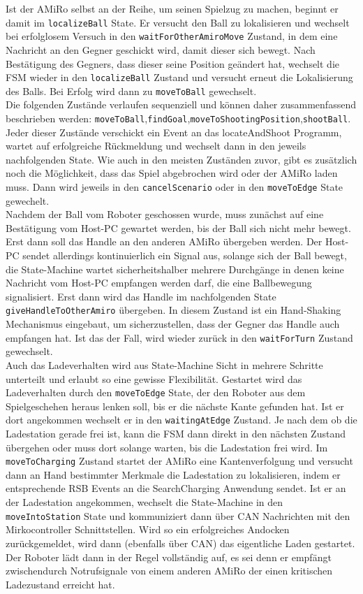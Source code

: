 Ist der AMiRo selbst an der Reihe, um seinen Spielzug zu machen, beginnt er damit im \texttt{localizeBall} State. Er versucht den Ball zu lokalisieren und wechselt bei erfolglosem Versuch in den \texttt{waitForOtherAmiroMove} Zustand, in dem eine Nachricht an den Gegner geschickt wird, damit dieser sich bewegt. Nach Bestätigung des Gegners, dass dieser seine Position geändert hat, wechselt die FSM wieder in den \texttt{localizeBall} Zustand und versucht erneut die Lokalisierung des Balls. Bei Erfolg wird dann zu \texttt{moveToBall} gewechselt.\\
Die folgenden Zustände verlaufen sequenziell und können daher zusammenfassend beschrieben werden:
\texttt{moveToBall},\texttt{findGoal},\texttt{moveToShootingPosition},\texttt{shootBall}. Jeder dieser Zustände verschickt ein Event an das locateAndShoot Programm, wartet auf erfolgreiche Rückmeldung und wechselt dann in den jeweils nachfolgenden State. Wie auch in den meisten Zuständen zuvor, gibt es zusätzlich noch die Möglichkeit, dass das Spiel abgebrochen wird oder der AMiRo laden muss. Dann wird jeweils in den \texttt{cancelScenario} oder in den \texttt{moveToEdge} State gewechelt.\\
Nachdem der Ball vom Roboter geschossen wurde, muss zunächst auf eine Bestätigung vom Host-PC gewartet werden, bis der Ball sich nicht mehr bewegt. Erst dann soll das Handle an den anderen AMiRo übergeben werden. Der Host-PC sendet allerdings kontinuierlich ein Signal aus, solange sich der Ball bewegt, die State-Machine wartet sicherheitshalber mehrere Durchgänge in denen keine Nachricht vom Host-PC empfangen werden darf, die eine Ballbewegung signalisiert. Erst dann wird das Handle im nachfolgenden State \texttt{giveHandleToOtherAmiro} übergeben. In diesem Zustand ist ein Hand-Shaking Mechanismus eingebaut, um sicherzustellen, dass der Gegner das Handle auch empfangen hat. Ist das der Fall, wird wieder zurück in den \texttt{waitForTurn} Zustand gewechselt.\\
Auch das Ladeverhalten wird aus State-Machine Sicht in mehrere Schritte unterteilt und erlaubt so eine gewisse Flexibilität. Gestartet wird das Ladeverhalten durch den \texttt{moveToEdge} State, der den Roboter aus dem Spielgeschehen heraus lenken soll, bis er die nächste Kante gefunden hat. Ist er dort angekommen wechselt er in den \texttt{waitingAtEdge} Zustand. Je nach dem ob die Ladestation gerade frei ist, kann die FSM dann direkt in den nächsten Zustand übergehen oder muss dort solange warten, bis die Ladestation frei wird. Im \texttt{moveToCharging} Zustand startet der AMiRo eine Kantenverfolgung und versucht dann an Hand bestimmter Merkmale die Ladestation zu lokalisieren, indem er entsprechende RSB Events an die SearchCharging Anwendung sendet. Ist er an der Ladestation angekommen, wechselt die State-Machine in den \texttt{moveIntoStation} State und kommuniziert dann über CAN Nachrichten mit den Mirkocontroller Schnittstellen. Wird so ein erfolgreiches Andocken zurückgemeldet, wird dann (ebenfalls über CAN) das eigentliche Laden gestartet. Der Roboter lädt dann in der Regel vollständig auf, es sei denn er empfängt zwischendurch Notrufsignale von einem anderen AMiRo der einen kritischen Ladezustand erreicht hat. 

